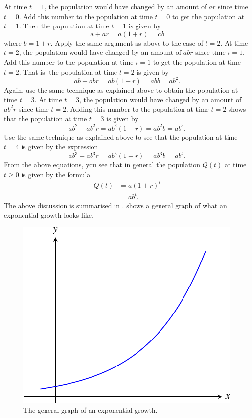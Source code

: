 \documentclass[a4paper,oneside,12pt]{article}
\begin{document}
At time $t = 1$, the population would have changed by an amount of
$ar$ since time $t = 0$.  Add this number to the population at time
$t = 0$ to get the population at $t = 1$.  Then the population at time
$t = 1$ is given by
\[
a + ar
=
a(1 + r)
=
ab
\]
where $b = 1 + r$.  Apply the same argument as above to the case of
$t = 2$.  At time $t = 2$, the population would have changed by an
amount of $abr$ since time $t = 1$.  Add this number to the population
at time $t = 1$ to get the population at time $t = 2$.  That is, the
population at time $t = 2$ is given by
\[
ab + abr
=
ab(1 + r)
=
abb
=
ab^2.
\]
Again, use the same technique as explained above to obtain the
population at time $t = 3$.  At time $t = 3$, the population would
have changed by an amount of $ab^2r$ since time $t = 2$.  Adding this
number to the population at time $t = 2$ shows that the population at
time $t = 3$ is given by
\[
ab^2 + ab^2r
=
ab^2 (1 + r)
=
ab^2b
=
ab^3.
\]
Use the same technique as explained above to see that the population
at time $t = 4$ is given by the expression
\[
ab^3 + ab^3r
=
ab^3 (1 + r)
=
ab^3b
=
ab^4.
\]
From the above equations, you see that in general the population
$Q(t)$ at time $t \geq 0$ is given by the formula
\begin{equation}
\label{eqn:exponential:exponential_growth}
\begin{aligned}
Q(t)
&=
a(1 + r)^t \\[4pt]
&=
ab^t.
\end{aligned}
\end{equation}
The above discussion is summarised in
.
 shows a general
graph of what an exponential growth looks like.

\begin{figure}[!htbp]
\centering
\includegraphics[scale=1.1]{image/11/exponential-growth.pdf}
\caption{%
  The general graph of an exponential growth.
}
\label{fig:exponential:general_exponential_growth}
\end{figure}
\end{document}
